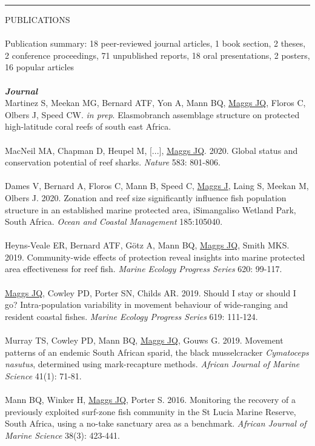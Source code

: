 \documentclass[10pt,a4paper]{article}
\begin{document}
\hrule
\newpage
\vspace{6pt}
\noindent
PUBLICATIONS\\
\\
Publication summary: 18 peer-reviewed journal articles, 1 book section, 2 theses, 2 conference proceedings, 71 unpublished reports, 18 oral presentations, 2 posters, 16 popular articles\\ 
\\
\textit{\textbf{Journal}}\\
\noindent
Martinez S, Meekan MG, Bernard ATF, Yon A, Mann BQ, \underline{Maggs JQ}, Floros C, Olbers J, Speed CW. \textit{in prep}. Elasmobranch assemblage structure on protected high-latitude coral reefs of south east Africa.\\
\\
MacNeil MA, Chapman D, Heupel M, [...], \underline{Maggs JQ}. 2020. Global status and conservation potential of reef sharks. \textit{Nature} 583: 801-806.\\
\\
Dames V, Bernard A, Floros C, Mann B, Speed C, \underline{Maggs J}, Laing S, Meekan M, Olbers J. 2020. Zonation and reef size significantly influence fish population structure in an established marine protected area, iSimangaliso Wetland Park, South Africa. \textit{Ocean and Coastal Management} 185:105040.\\
\\
Heyns-Veale ER, Bernard ATF, G\"otz A, Mann BQ, \underline{Maggs JQ}, Smith MKS. 2019. Community-wide effects of protection reveal insights into marine protected area effectiveness for reef fish. \textit{Marine Ecology Progress Series} 620: 99-117.\\
\\
\underline{Maggs JQ}, Cowley PD, Porter SN, Childs AR. 2019. Should I stay or should I go? Intra-population variability in movement behaviour of wide-ranging and resident coastal fishes. \textit{Marine Ecology Progress Series} 619: 111-124.\\
\\ 
Murray TS, Cowley PD, Mann BQ, \underline{Maggs JQ}, Gouws G. 2019. Movement patterns of an endemic South African sparid, the black musselcracker \textit{Cymatoceps nasutus}, determined using mark-recapture methods. \textit{African Journal of Marine Science} 41(1): 71-81.\\
\\  
Mann BQ, Winker H, \underline{Maggs JQ}, Porter S. 2016. Monitoring the recovery of a previously exploited surf-zone fish community in the St Lucia Marine Reserve, South Africa, using a no-take sanctuary area as a benchmark. \textit{African Journal of Marine Science} 38(3): 423-441.\\
\end{document}
